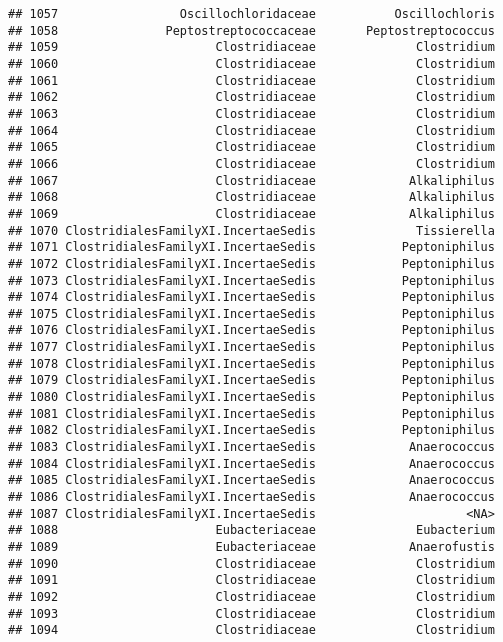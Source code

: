 \documentclass[
]{article}
\begin{document}
\begin{verbatim}
## 1057                 Oscillochloridaceae           Oscillochloris
## 1058               Peptostreptococcaceae       Peptostreptococcus
## 1059                      Clostridiaceae              Clostridium
## 1060                      Clostridiaceae              Clostridium
## 1061                      Clostridiaceae              Clostridium
## 1062                      Clostridiaceae              Clostridium
## 1063                      Clostridiaceae              Clostridium
## 1064                      Clostridiaceae              Clostridium
## 1065                      Clostridiaceae              Clostridium
## 1066                      Clostridiaceae              Clostridium
## 1067                      Clostridiaceae             Alkaliphilus
## 1068                      Clostridiaceae             Alkaliphilus
## 1069                      Clostridiaceae             Alkaliphilus
## 1070 ClostridialesFamilyXI.IncertaeSedis              Tissierella
## 1071 ClostridialesFamilyXI.IncertaeSedis            Peptoniphilus
## 1072 ClostridialesFamilyXI.IncertaeSedis            Peptoniphilus
## 1073 ClostridialesFamilyXI.IncertaeSedis            Peptoniphilus
## 1074 ClostridialesFamilyXI.IncertaeSedis            Peptoniphilus
## 1075 ClostridialesFamilyXI.IncertaeSedis            Peptoniphilus
## 1076 ClostridialesFamilyXI.IncertaeSedis            Peptoniphilus
## 1077 ClostridialesFamilyXI.IncertaeSedis            Peptoniphilus
## 1078 ClostridialesFamilyXI.IncertaeSedis            Peptoniphilus
## 1079 ClostridialesFamilyXI.IncertaeSedis            Peptoniphilus
## 1080 ClostridialesFamilyXI.IncertaeSedis            Peptoniphilus
## 1081 ClostridialesFamilyXI.IncertaeSedis            Peptoniphilus
## 1082 ClostridialesFamilyXI.IncertaeSedis            Peptoniphilus
## 1083 ClostridialesFamilyXI.IncertaeSedis             Anaerococcus
## 1084 ClostridialesFamilyXI.IncertaeSedis             Anaerococcus
## 1085 ClostridialesFamilyXI.IncertaeSedis             Anaerococcus
## 1086 ClostridialesFamilyXI.IncertaeSedis             Anaerococcus
## 1087 ClostridialesFamilyXI.IncertaeSedis                     <NA>
## 1088                      Eubacteriaceae              Eubacterium
## 1089                      Eubacteriaceae             Anaerofustis
## 1090                      Clostridiaceae              Clostridium
## 1091                      Clostridiaceae              Clostridium
## 1092                      Clostridiaceae              Clostridium
## 1093                      Clostridiaceae              Clostridium
## 1094                      Clostridiaceae              Clostridium

\end{verbatim}
\end{document}
